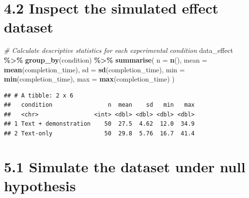 \documentclass[
]{article}
\newenvironment{Shaded}{\begin{snugshade}}{\end{snugshade}}
\newcommand{\AttributeTok}[1]{\textcolor[rgb]{0.13,0.29,0.53}{#1}}
\newcommand{\CommentTok}[1]{\textcolor[rgb]{0.56,0.35,0.01}{\textit{#1}}}
\newcommand{\FunctionTok}[1]{\textcolor[rgb]{0.13,0.29,0.53}{\textbf{#1}}}
\newcommand{\NormalTok}[1]{#1}
\newcommand{\SpecialCharTok}[1]{\textcolor[rgb]{0.81,0.36,0.00}{\textbf{#1}}}
\begin{document}
\section{4.2 Inspect the simulated effect
dataset}\label{inspect-the-simulated-effect-dataset}

\begin{Shaded}
\begin{Highlighting}[]
\CommentTok{\# Calculate descriptive statistics for each experimental condition}
\NormalTok{data\_effect }\SpecialCharTok{\%\textgreater{}\%}
  \FunctionTok{group\_by}\NormalTok{(condition) }\SpecialCharTok{\%\textgreater{}\%}
  \FunctionTok{summarise}\NormalTok{(}
    \AttributeTok{n =} \FunctionTok{n}\NormalTok{(),}
    \AttributeTok{mean =} \FunctionTok{mean}\NormalTok{(completion\_time),}
    \AttributeTok{sd =} \FunctionTok{sd}\NormalTok{(completion\_time),}
    \AttributeTok{min =} \FunctionTok{min}\NormalTok{(completion\_time),}
    \AttributeTok{max =} \FunctionTok{max}\NormalTok{(completion\_time)}
\NormalTok{  )}
\end{Highlighting}
\end{Shaded}

\begin{verbatim}
## # A tibble: 2 x 6
##   condition                n  mean    sd   min   max
##   <chr>                <int> <dbl> <dbl> <dbl> <dbl>
## 1 Text + demonstration    50  27.5  4.62  12.0  34.9
## 2 Text-only               50  29.8  5.76  16.7  41.4
\end{verbatim}

\section{5.1 Simulate the dataset under null
hypothesis}\label{simulate-the-dataset-under-null-hypothesis}
\end{document}
